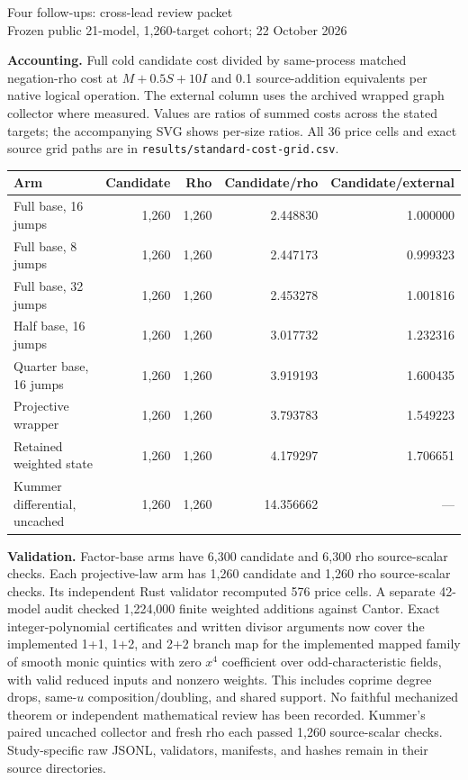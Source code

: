 \documentclass[10pt]{article}
\begin{document}
\begin{center}\Large Four follow-ups: cross-lead review packet\\[2pt]
\normalsize Frozen public 21-model, 1,260-target cohort; 22 October 2026\end{center}
\noindent\textbf{Accounting.} Full cold candidate cost divided by same-process matched negation-rho cost at $M+0.5S+10I$ and 0.1 source-addition equivalents per native logical operation. The external column uses the archived wrapped graph collector where measured. Values are ratios of summed costs across the stated targets; the accompanying SVG shows per-size ratios. All 36 price cells and exact source grid paths are in \texttt{results/standard-cost-grid.csv}.
\par\medskip
\begin{center}\small\begin{tabular}{l|r r|r r}
Arm & Candidate & Rho & Candidate/rho & Candidate/external\\\hline
Full base, 16 jumps & 1,260 & 1,260 & 2.448830 & 1.000000\\
Full base, 8 jumps & 1,260 & 1,260 & 2.447173 & 0.999323\\
Full base, 32 jumps & 1,260 & 1,260 & 2.453278 & 1.001816\\
Half base, 16 jumps & 1,260 & 1,260 & 3.017732 & 1.232316\\
Quarter base, 16 jumps & 1,260 & 1,260 & 3.919193 & 1.600435\\
Projective wrapper & 1,260 & 1,260 & 3.793783 & 1.549223\\
Retained weighted state & 1,260 & 1,260 & 4.179297 & 1.706651\\
Kummer differential, uncached & 1,260 & 1,260 & 14.356662 & ---\\
\end{tabular}\end{center}
\noindent\textbf{Validation.} Factor-base arms have 6,300 candidate and 6,300 rho source-scalar checks. Each projective-law arm has 1,260 candidate and 1,260 rho source-scalar checks. Its independent Rust validator recomputed 576 price cells. A separate 42-model audit checked 1,224,000 finite weighted additions against Cantor. Exact integer-polynomial certificates and written divisor arguments now cover the implemented 1+1, 1+2, and 2+2 branch map for the implemented mapped family of smooth monic quintics with zero $x^4$ coefficient over odd-characteristic fields, with valid reduced inputs and nonzero weights. This includes coprime degree drops, same-$u$ composition/doubling, and shared support. No faithful mechanized theorem or independent mathematical review has been recorded. Kummer's paired uncached collector and fresh rho each passed 1,260 source-scalar checks. Study-specific raw JSONL, validators, manifests, and hashes remain in their source directories.
\end{document}
